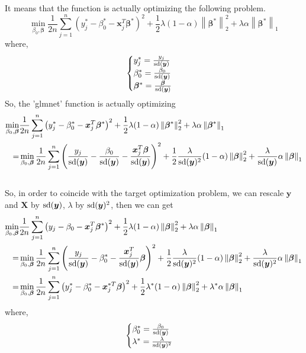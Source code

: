 \documentclass[letter]{article}
\newcommand{\norm}[1]{\left\lVert#1\right\rVert}
\begin{document}
	It means that the function is actually optimizing the following problem.
	$$\min_{\beta_0,\bm{\beta}}\frac{1}{2n}\sum_{j=1}^{n}\left(y_j^*-\beta_0^*-\bm{x}_j^T\bm{\beta}^*\right)^2+\frac{1}{2}\lambda(1-\alpha)\norm{\bm{\beta}^*}_2^2+\lambda\alpha\norm{\bm{\beta}^*}_1$$
	where,
	$$\begin{cases}
	y_j^*=\frac{y_j}{{\rm sd}(\bm{y})} \\
	\beta_0^*=\frac{\beta_0}{{\rm sd}(\bm{y})} \\
	\bm{\beta}^*=\frac{\bm{\beta}}{{\rm sd}(\bm{y})} \\
	\end{cases}$$
	So, the 'glmnet' function is actually optimizing
	$$\begin{aligned}
	\min_{\beta_0,\bm{\beta}}&\frac{1}{2n}\sum_{j=1}^{n}\left(y_j^*-\beta_0^*-\bm{x}_j^T\bm{\beta}^*\right)^2+\frac{1}{2}\lambda(1-\alpha)\norm{\bm{\beta}^*}_2^2+\lambda\alpha\norm{\bm{\beta}^*}_1 \\
	=&\min_{\beta_0,\bm{\beta}}\frac{1}{2n}\sum_{j=1}^{n}\left(\frac{y_j}{{\rm sd}(\bm{y})}-\frac{\beta_0}{{\rm sd}(\bm{y})}-\frac{\bm{x}_j^T\bm{\beta}}{{\rm sd}(\bm{y})}\right)^2+\frac{1}{2}\frac{\lambda}{{\rm sd}(\bm{y})^2}(1-\alpha)\norm{\bm{\beta}}_2^2+\frac{\lambda}{{\rm sd}(\bm{y})}\alpha\norm{\bm{\beta}}_1 \\
	\end{aligned}$$
	\\
	So, in order to coincide with the target optimization problem, we can rescale $\bm{y}$ and $\bm{X}$ by ${\rm sd}(\bm{y})$, $\lambda$  by ${\rm sd}(\bm{y})^2$, then we can get
	$$\begin{aligned}\min_{\beta_0,\bm{\beta}}&\frac{1}{2n}\sum_{j=1}^{n}\left(y_j-\beta_0-\bm{x}_j^T\bm{\beta}^*\right)^2+\frac{1}{2}\lambda(1-\alpha)\norm{\bm{\beta}}_2^2+\lambda\alpha\norm{\bm{\beta}}_1 \\
	=&\min_{\beta_0,\bm{\beta}}\frac{1}{2n}\sum_{j=1}^{n}\left(\frac{y_j}{{\rm sd}(\bm{y})}-\beta_0^*-\frac{\bm{x}_j^T}{{\rm sd}(\bm{y})}\bm{\beta}\right)^2+\frac{1}{2}\frac{\lambda}{{\rm sd}(\bm{y})^2}(1-\alpha)\norm{\bm{\beta}}_2^2+\frac{\lambda}{{\rm sd}(\bm{y})^2}\alpha\norm{\bm{\beta}}_1 \\
	=&\min_{\beta_0,\bm{\beta}}\frac{1}{2n}\sum_{j=1}^{n}\left(y_j^*-\beta_0^*-\bm{x}_j^{*T}\bm{\beta}\right)^2+\frac{1}{2}\lambda^*(1-\alpha)\norm{\bm{\beta}}_2^2+\lambda^*\alpha\norm{\bm{\beta}}_1 \\
	\end{aligned}$$
	where,
	$$\begin{cases}
	\beta_0^*=\frac{\beta_0}{{\rm sd}(\bm{y})} \\
	\lambda^*=\frac{\lambda}{{\rm sd}(\bm{y})^2}
	\end{cases}$$
	
\end{document}
